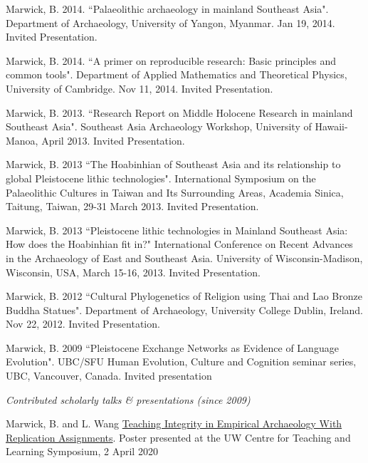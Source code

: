 \ind Marwick, B. 2014. ``Palaeolithic archaeology in mainland Southeast Asia". Department of Archaeology, University of Yangon, Myanmar. Jan 19, 2014. Invited Presentation.

\ind Marwick, B. 2014. ``A primer on reproducible research: Basic principles and common tools". Department of Applied Mathematics and Theoretical Physics, University of Cambridge. Nov 11, 2014. Invited Presentation.

\ind Marwick, B. 2013. ``Research Report on Middle Holocene Research in mainland Southeast Asia". Southeast Asia Archaeology Workshop, University of Hawaii-Manoa, April 2013. Invited Presentation.

\ind Marwick, B. 2013 ``The Hoabinhian of Southeast Asia and its relationship to global Pleistocene lithic technologies". International Symposium on the Palaeolithic Cultures in Taiwan and Its Surrounding Areas, Academia Sinica, Taitung, Taiwan, 29-31 March 2013.  Invited Presentation.

\ind Marwick, B. 2013 ``Pleistocene lithic technologies in Mainland Southeast Asia: How does the Hoabinhian fit in?"  International Conference on Recent Advances in the Archaeology of East and Southeast Asia. University of Wisconsin-Madison, Wisconsin, USA, March 15-16, 2013. Invited Presentation.

\ind Marwick, B. 2012 ``Cultural Phylogenetics of Religion using Thai and Lao Bronze Buddha Statues". Department of Archaeology, University College Dublin, Ireland. Nov 22, 2012. Invited Presentation.

\ind Marwick, B. 2009 ``Pleistocene Exchange Networks as Evidence of Language Evolution".  UBC/SFU Human Evolution, Culture and Cognition seminar series, UBC, Vancouver, Canada. Invited presentation

\bigskip



\noindent\emph{Contributed scholarly talks \& presentations (since 2009)\vspace{0.01in}}

\medskip

\ind Marwick, B. and L. Wang \href{https://www.washington.edu/teaching/2020/04/02/34-teaching-integrity-in-empirical-archaeology-with-replication-assignments/}{Teaching Integrity in Empirical Archaeology With Replication Assignments}. Poster presented at the UW Centre for Teaching and Learning Symposium, 2 April 2020   

